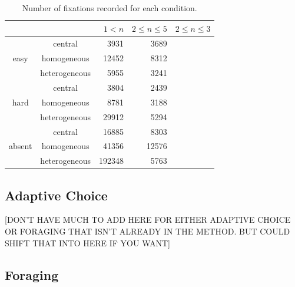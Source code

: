\documentclass[a4paper, oneside, 11pt, onecolumn]{article}
\begin{document}
\begin{table}
\centering
\small
\begin{tabular}{c|c|r|r|r}
 		&	& $1<n$	& $2 \leq n \leq 5$ & $2 \leq n \leq 3$\\
\hline
\multirow{3}{*}{easy} 
& central		& 3931 	& 3689	& \\
& homogeneous 	& 12452	& 8312 	&\\
& heterogeneous & 5955	& 3241 	&\\
\hline
\multirow{3}{*}{hard} 
& central		& 3804 	& 2439	& \\
& homogeneous 	& 8781	& 3188	&	\\
& heterogeneous & 29912	& 5294	&\\
\hline
\multirow{3}{*}{absent} 
& central		& 16885 & 8303	& \\
& homogeneous 	& 41356	& 12576	&\\
& heterogeneous & 192348& 5763	&\\
\hline


\end{tabular}
\caption{Number of fixations recorded for each condition.}
\label{tab:num_fix}
\end{table}

\subsection{Adaptive Choice}

[DON'T HAVE MUCH TO ADD HERE FOR EITHER ADAPTIVE CHOICE OR FORAGING THAT ISN'T ALREADY IN THE METHOD. BUT COULD SHIFT THAT INTO HERE IF YOU WANT]

\subsection{Foraging}
\end{document}
